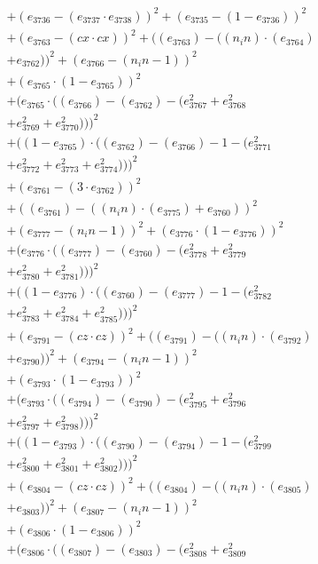 \documentclass[10pt, a4paper]{article}
\begin{document}
\begin{align*}
& + (e_{3736} - (e_{3737}  \cdot  e_{3738}))^{2} + (e_{3735} - (1 - e_{3736}))^{2} \\
& + (e_{3763} - (cx  \cdot  cx))^{2} + ((e_{3763}) - ((n_in)  \cdot  (e_{3764}) \\
& + e_{3762}))^{2} + (e_{3766} - (n_in - 1))^{2} \\
& + (e_{3765}  \cdot  (1 - e_{3765}))^{2} \\
& + (e_{3765}  \cdot  ((e_{3766}) - (e_{3762}) - (e_{3767}^{2} + e_{3768}^{2} \\
& + e_{3769}^{2} + e_{3770}^{2})))^{2} \\
& + ((1 - e_{3765})  \cdot  ((e_{3762}) - (e_{3766}) - 1 - (e_{3771}^{2} \\
& + e_{3772}^{2} + e_{3773}^{2} + e_{3774}^{2})))^{2} \\
& + (e_{3761} - (3  \cdot  e_{3762}))^{2} \\
& + ((e_{3761}) - ((n_in)  \cdot  (e_{3775}) + e_{3760}))^{2} \\
& + (e_{3777} - (n_in - 1))^{2} + (e_{3776}  \cdot  (1 - e_{3776}))^{2} \\
& + (e_{3776}  \cdot  ((e_{3777}) - (e_{3760}) - (e_{3778}^{2} + e_{3779}^{2} \\
& + e_{3780}^{2} + e_{3781}^{2})))^{2} \\
& + ((1 - e_{3776})  \cdot  ((e_{3760}) - (e_{3777}) - 1 - (e_{3782}^{2} \\
& + e_{3783}^{2} + e_{3784}^{2} + e_{3785}^{2})))^{2} \\
& + (e_{3791} - (cz  \cdot  cz))^{2} + ((e_{3791}) - ((n_in)  \cdot  (e_{3792}) \\
& + e_{3790}))^{2} + (e_{3794} - (n_in - 1))^{2} \\
& + (e_{3793}  \cdot  (1 - e_{3793}))^{2} \\
& + (e_{3793}  \cdot  ((e_{3794}) - (e_{3790}) - (e_{3795}^{2} + e_{3796}^{2} \\
& + e_{3797}^{2} + e_{3798}^{2})))^{2} \\
& + ((1 - e_{3793})  \cdot  ((e_{3790}) - (e_{3794}) - 1 - (e_{3799}^{2} \\
& + e_{3800}^{2} + e_{3801}^{2} + e_{3802}^{2})))^{2} \\
& + (e_{3804} - (cz  \cdot  cz))^{2} + ((e_{3804}) - ((n_in)  \cdot  (e_{3805}) \\
& + e_{3803}))^{2} + (e_{3807} - (n_in - 1))^{2} \\
& + (e_{3806}  \cdot  (1 - e_{3806}))^{2} \\
& + (e_{3806}  \cdot  ((e_{3807}) - (e_{3803}) - (e_{3808}^{2} + e_{3809}^{2} \\

\end{align*}
\end{document}
